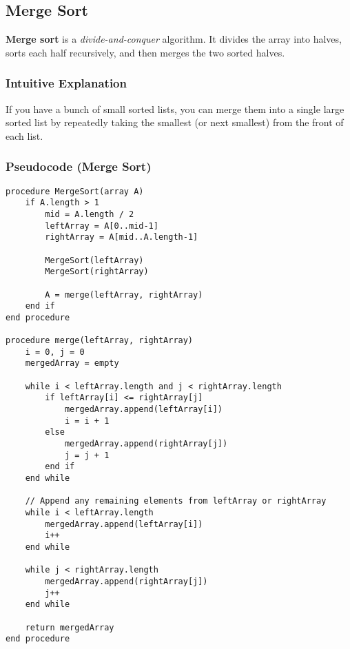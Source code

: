 \documentclass[a4paper,12pt]{article}
\begin{document}
\subsection{Merge Sort}
\textbf{Merge sort} is a \emph{divide-and-conquer} algorithm. It divides the array into halves, sorts each half recursively, and then merges the two sorted halves.

\subsubsection*{Intuitive Explanation}
If you have a bunch of small sorted lists, you can merge them into a single large sorted list by repeatedly taking the smallest (or next smallest) from the front of each list.

\subsubsection*{Pseudocode (Merge Sort)}
\begin{verbatim}
procedure MergeSort(array A)
    if A.length > 1
        mid = A.length / 2
        leftArray = A[0..mid-1]
        rightArray = A[mid..A.length-1]

        MergeSort(leftArray)
        MergeSort(rightArray)

        A = merge(leftArray, rightArray)
    end if
end procedure

procedure merge(leftArray, rightArray)
    i = 0, j = 0
    mergedArray = empty

    while i < leftArray.length and j < rightArray.length
        if leftArray[i] <= rightArray[j]
            mergedArray.append(leftArray[i])
            i = i + 1
        else
            mergedArray.append(rightArray[j])
            j = j + 1
        end if
    end while

    // Append any remaining elements from leftArray or rightArray
    while i < leftArray.length
        mergedArray.append(leftArray[i])
        i++
    end while

    while j < rightArray.length
        mergedArray.append(rightArray[j])
        j++
    end while

    return mergedArray
end procedure
\end{verbatim}
\end{document}
